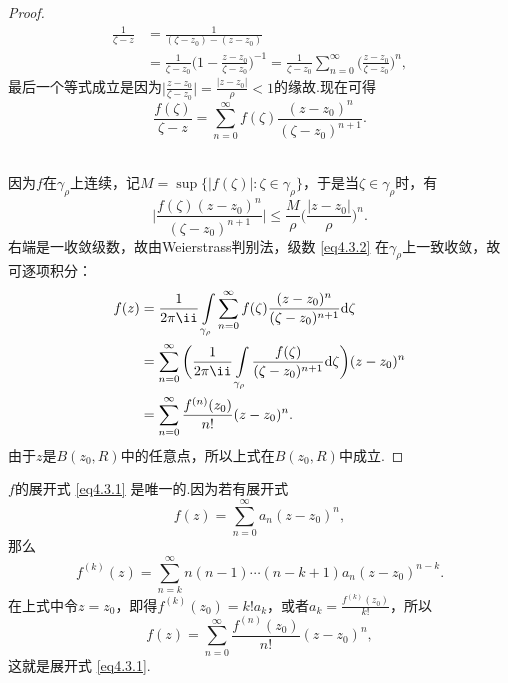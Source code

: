 \begin{proof}
\noindent\begin{minipage}{0.7\textwidth}
\begin{align*}
\frac1{\zeta-z}&=\frac1{(\zeta-z_0)-(z-z_0)}\\
&=\frac1{\zeta-z_0}\bigg(1-\frac{z-z_0}{\zeta-z_0}\bigg)^{-1}
=\frac1{\zeta-z_0}\sum_{n=0}^\infty\bigg(\frac{z-z_0}{\zeta-z_0}\bigg)^n,
\end{align*}
最后一个等式成立是因为$\bigg|\frac{z-z_0}{\zeta-z_0}\bigg|=\frac{|z-z_0|}\rho<1$的缘故.现在可得
\begin{equation}\label{eq4.3.2}
\frac{f(\zeta)}{\zeta-z}=\sum_{n=0}^\infty f(\zeta)\frac{(z-z_0)^n}{(\zeta-z_0)^{n+1}}.
\end{equation}
\end{minipage}
\begin{minipage}{0.3\textwidth}
\centering
{}
\end{minipage}\\[1mm]
因为$f$在$\gamma_\rho$上连续，记$M=\sup\{|f(\zeta)|:\zeta\in\gamma_\rho\}$，于是当$\zeta\in\gamma_\rho$时，有
\[\bigg|\frac{f(\zeta)(z-z_0)^n}{(\zeta-z_0)^{n+1}}\bigg|\le\frac M\rho\bigg(
\frac{|z-z_0|}\rho\bigg)^n.\]
右端是一收敛级数，故由Weierstrass判别法，级数 \eqref{eq4.3.2} 在$\gamma_\rho$上一致收敛，故可逐项积分：
\begin{align*}
f(z)&=\frac1{2\pi\ii}\int\limits_{\gamma_\rho}\sum_{n=0}^\infty f(\zeta)\frac{(z-z_0)^n}{(\zeta-z_0)^{n+1}}\textrm d\zeta\\
&=\sum_{n=0}^\infty\bigg(\frac1{2\pi\ii}\int\limits_{\gamma_\rho}
\frac{f(\zeta)}{(\zeta-z_0)^{n+1}}\textrm d\zeta\bigg)(z-z_0)^n\\
&=\sum_{n=0}^\infty \frac{f^{(n)}(z_0)}{n!}(z-z_0)^n.
\end{align*}
由于$z$是$B(z_0,R)$中的任意点，所以上式在$B(z_0,R)$中成立.
\end{proof}

$f$的展开式 \eqref{eq4.3.1} 是唯一的.因为若有展开式
\[f(z)=\sum_{n=0}^\infty a_n(z-z_0)^n,\]
那么
\[f^{(k)}(z)=\sum_{n=k}^\infty n(n-1)\cdots(n-k+1)a_n(z-z_0)^{n-k}.\]
在上式中令$z=z_0$，即得$f^{(k)}(z_0)=k!a_k$，或者$a_k=\frac{f^{(k)}(z_0)}{k!}$，所以
\begin{equation*}
f(z)=\sum_{n=0}^\infty \frac{f^{(n)}(z_0)}{n!}(z-z_0)^n,
\end{equation*}
这就是展开式 \eqref{eq4.3.1}.

